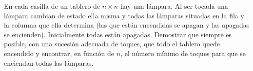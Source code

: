 En cada casilla de un tablero de $n \times n$ hay una lámpara. Al ser tocada una lámpara cambian de estado ella misma y todas las lámparas situadas en la fila y la columna que ella determina (las que están encendidas se apagan y las apagadas se encienden). Inicialmente todas están apagadas. Demostrar que siempre es posible, con una sucesión adecuada de toques, que todo el tablero quede encendido y encontrar, en función de $n$, el número mínimo de toques para que se enciendan todas las lámparas.